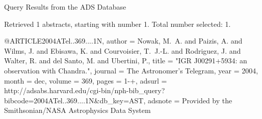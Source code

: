 Query Results from the ADS Database


Retrieved 1 abstracts, starting with number 1.  Total number selected: 1.

@ARTICLE{2004ATel..369....1N,
   author = {{Nowak}, M.~A. and {Paizis}, A. and {Wilms}, J. and {Ebisawa}, K. and 
	{Courvoisier}, T.~J.-L. and {Rodriguez}, J. and {Walter}, R. and 
	{del Santo}, M. and {Ubertini}, P.},
    title = "{IGR J00291+5934: an observation with Chandra.}",
  journal = {The Astronomer's Telegram},
     year = 2004,
    month = dec,
   volume = 369,
    pages = {1-+},
   adsurl = {http://adsabs.harvard.edu/cgi-bin/nph-bib_query?bibcode=2004ATel..369....1N&db_key=AST},
  adsnote = {Provided by the Smithsonian/NASA Astrophysics Data System}
}


